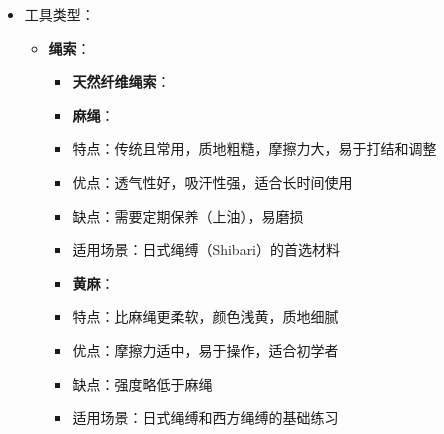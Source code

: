 \documentclass[12pt,UTF8]{ctexbook}
\begin{document}
\begin{itemize}
\begin{itemize}
\begin{itemize}
\begin{itemize}
          \item 龟甲绑（Kikkou）：胸部或背部的菱形图案，需要精确的绳索排列
          \item 蛛网绑（Kumo）：类似蜘蛛网的复杂图案，覆盖更大面积
        \item \textbf{悬挂捆绑安全要点}（需专业指导）：
          \item 学习专业课程：悬挂捆绑需要专业知识和技能，不建议自学
          \item 设备要求：使用专业的悬挂点和安全设备，确保承重能力
          \item 承重分布：将重量均匀分布在多个支撑点，避免单点承重
          \item 姿势选择：避免压迫内脏和重要血管，选择安全的悬挂姿势
        \item \textbf{进阶安全考虑}：
          \item 学习解剖学：深入了解人体结构，特别是神经和血管的位置
          \item 练习和经验：在专业指导下逐步练习，积累经验
          \item 应急准备：制定详细的应急计划，包括如何快速解除复杂捆绑
          \item 定期检查：定期检查绳索和设备的状况，确保安全使用
        \end{itemize}
      \end{itemize}
    \item 工具类型：
      \begin{itemize}
      \item \textbf{绳索}：
        \begin{itemize}
        \item \textbf{天然纤维绳索}：
          \item \textbf{麻绳}：
            \item 特点：传统且常用，质地粗糙，摩擦力大，易于打结和调整
            \item 优点：透气性好，吸汗性强，适合长时间使用
            \item 缺点：需要定期保养（上油），易磨损
            \item 适用场景：日式绳缚（Shibari）的首选材料
          \item \textbf{黄麻}：
            \item 特点：比麻绳更柔软，颜色浅黄，质地细腻
            \item 优点：摩擦力适中，易于操作，适合初学者
            \item 缺点：强度略低于麻绳
            \item 适用场景：日式绳缚和西方绳缚的基础练习

\end{itemize}
\end{itemize}
\end{itemize}
\end{itemize}
\end{document}
